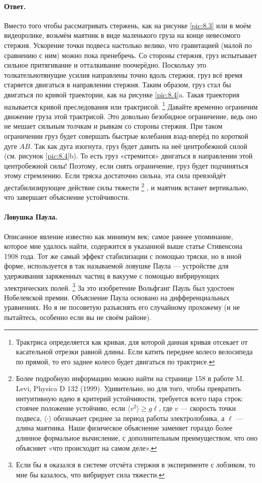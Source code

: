 \paragraph{Ответ.}
Вместо того чтобы рассматривать стержень, как на рисунке
\ref{pic:8.3} или в моём видеоролике, возьмём маятник в виде маленького груза на конце невесомого стержня.
Ускорение точки подвеса настолько велико, что гравитацией (малой по сравнению с ним) можно пока пренебречь.
Со стороны стержня, груз испытывает сильное притягивание и отталкивание поочерёдно.
Поскольку это толкательнотянущие усилия направлены точно вдоль стержня, груз всё время старяется двигаться в направлении стержня.
Таким образом, груз стал бы двигаться по кривой траектории, как на рисунке \ref{pic:8.4}a.
Такая траектория называется кривой преследования или трактрисой.%
\footnote{Трактриса определяется как кривая, для которой данная кривая отсекает от касательной отрезки равной длины. Если катить переднее колесо велосипеда по прямой, то его заднее колесо будет двигаться по трактрисе.}
Давайте временно ограничим движение груза этой трактрисой.
Это довольно безобидное ограничение, ведь оно не мешает сильным толчкам и рывкам со стороны стержня.
При таком ограничении груз будет совершать быстрые колебания взад-вперёд по короткой дуге $AB$.
Так как дуга изогнута, груз будет давить на неё центробежной силой (см. рисунок \ref{pic:8.4}b).
То есть груз «стремится» двигаться в направлении этой центробежной силы!
Поэтому, если снять ограничение, груз будет подчиняться этому стремлению.
Если тряска достаточно сильна, эта сила превзойдёт дестабилизирующее действие силы тяжести%
\footnote{Более подробную информацию можно найти на странице 158 в работе M. Levi, Physica D 132 (1999).
Удивительно, но для того, чтобы превратить интуитивную идею в критерий устойчивости, требуется всего пара строк: стоячее положение устойчиво, если  $
\langle v^2 \rangle \ge g \ell$,
где $v$ --- скорость точки подвеса, $\langle \cdot \rangle$ обозначает среднее за период работы электролобзика, а $\ell$ --- длина маятника.
Наше физическое объяснение заменяет гораздо более длинное формальное вычисление, с дополнительным преимуществом, что оно объясняет «что происходит на самом деле».}%
, и маятник встанет вертикально,
что завершает объяснение устойчивости.

\paragraph{Ловушка Паула.}
Описанное явление известно как минимум век;
самое раннее упоминание, которое мне удалось найти, содержится в указанной выше статье Стивенсона 1908 года.
Тот же самый эффект стабилизации с помощью тряски, но в иной форме, используется в так называемой ловушке Паула --- устройстве для удерживания заряженных частиц в вакууме с помощью вибрирующих электрических полей.%
\footnote{Если бы я оказался в системе отсчёта стержня в эксперименте с лобзиком, то мне бы казалось, что вибрирует сила тяжести.}
За это изобретение Вольфганг Пауль был удостоен Нобелевской премии.
Объяснение Паула основано на дифференциальных уравнениях.
Но я не посоветую разъяснять его случайному прохожему (и не пытайтесь, особенно если вы не своём районе).


